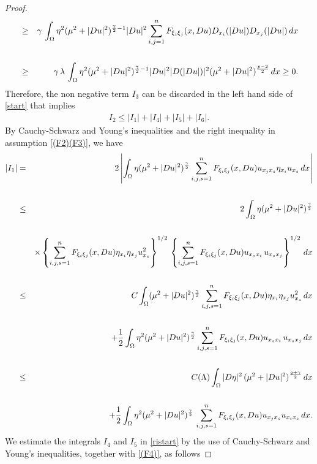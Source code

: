 \documentclass[12pt]{amsart}
\theoremstyle{definition}
\numberwithin{equation}{section}
\numberwithin{equation}{section}
\begin{document}
{\begin{proof}
\begin{eqnarray*}
&\ge&  \gamma \, \int_{\Omega} \eta^2 ({\mu}^2+|Du|^2)^{\frac{\gamma}{2}-1} {|Du|^2} \sum_{i,j =1}^n F_{\xi_i \xi_j}(x, Du) D_{x_i}(|Du|) D_{x_j}(|Du|) \, dx\cr\cr
&\ge&  \gamma \, {\lambda} \, \int_{\Omega} \eta^2 ({\mu}^2+|Du|^2)^{\frac{\gamma}{2}-1} {|Du|^2}  |D(|Du|)|^2  ({\mu}^2 + |Du|^2)^{\frac{p-2}{2}}  \, dx \ge 0.
\end{eqnarray*} 
Therefore, the non negative term $I_3$ can be discarded in the left hand side of  \eqref{start} that implies
\begin{eqnarray}\label{ristart}
	I_2\le |{I}_1|+|{I}_4|+|{I}_5|+|{I}_6|.
\end{eqnarray}
By  Cauchy-Schwarz and Young's inequalities and  the right inequality in assumption  \eqref{(F2)(F3)}, we have\\
\begin{eqnarray}\label{I1}
|{I}_1| &=& 2\left |\int_{\Omega}  \eta  ({\mu}^2 + |Du|^2)^{\frac{\gamma}{2}}   \sum_{i,j,s =1}^n F_{\xi_i \xi_j}(x, Du) u_{x_j x_s} \eta_{x_i} u_{x_s} \, dx\right |\cr\cr
&\le& 2\int_{\Omega}  \eta  ({\mu}^2 + |Du|^2)^{\frac{\gamma}{2}} \cr\cr
&& \times \left \{ \sum_{i,j,s =1}^n F_{\xi_i \xi_j}(x, Du) \eta_{x_i} \eta_{x_j} u_{x_s}^2\right \}^{1/2} \, \left \{ \sum_{i,j,s =1}^n F_{\xi_i \xi_j}(x, Du) u_{x_s x_i} \, u_{x_s x_j}\right \}^{1/2} \, dx \cr\cr
&\le &  C   \int_{\Omega}  ({\mu}^2 + |Du|^2)^{\frac{\gamma}{2}}  \sum_{i,j,s =1}^n F_{\xi_i \xi_j}(x, Du) \eta_{x_i} \eta_{x_j} u_{x_s}^2 \, dx\cr\cr
&&  + \frac{1}{2} \int_{\Omega} \eta^2  ({\mu}^2 + |Du|^2)^{\frac{\gamma}{2}}  \sum_{i,j,s =1}^n F_{\xi_i \xi_j}(x, Du) u_{x_s x_i} \, u_{x_s x_j}  \, dx \cr\cr
&\le& {C(\Lambda)} \int_{\Omega} |D \eta|^2 \,  {({\mu}^2 + |Du|^2)^{\frac{q + \gamma}{2}}}\, dx \cr\cr
&& + \frac{1}{2} \int_{\Omega} \eta^2  ({\mu}^2 + |Du|^2)^{\frac{\gamma}{2}}  \, \sum_{i,j,s =1}^n F_{\xi_i \xi_j}(x, Du) u_{x_j x_s} u_{x_i x_s} \, dx.
\end{eqnarray}
We  estimate the integrals $I_4$ and $I_5$ in \eqref{ristart} by the use of  Cauchy-Schwarz and  Young's inequalities, together with \eqref{(F4)}, as follows

\end{proof}}
\end{document}
